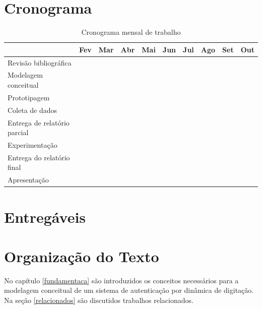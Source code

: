 \documentclass[pfc]{imetex}
\begin{document}
\section{Cronograma}
\begin{table}[htb]
\begin{tabular}{|l|c|c|c|c|c|c|c|c|c|}
\hline
& Fev & Mar & Abr & Mai & Jun & Jul & Ago & Set & Out \\
\hline
Revisão bibliográfica &
\multicolumn{2}{c}{\cellcolor[gray]{0.5}} &
\multicolumn{6}{c}{} &
\\
\hline
Modelagem conceitual &
\multicolumn{1}{c}{} &
\multicolumn{3}{c}{\cellcolor[gray]{0.5}} &
\multicolumn{4}{c}{} &
\\
\hline
Prototipagem &
\multicolumn{2}{c}{} &
\multicolumn{3}{c}{\cellcolor[gray]{0.5}} &
\multicolumn{3}{c}{} &
\\
\hline
Coleta de dados &
\multicolumn{4}{c}{} &
\multicolumn{1}{c}{\cellcolor[gray]{0.5}} &
\multicolumn{3}{c}{} &
\\
\hline
Entrega de relatório parcial &
\multicolumn{3}{c}{} &
\multicolumn{1}{c}{\cellcolor[gray]{0.5}} &
\multicolumn{1}{c}{} &
\multicolumn{1}{c}{\cellcolor[gray]{0.5}} &
\multicolumn{2}{c}{} &
\\
\hline
Experimentação &
\multicolumn{5}{c}{} &
\multicolumn{2}{c}{\cellcolor[gray]{0.5}} &
\multicolumn{1}{c}{} &
\\
\hline
Entrega do relatório final &
\multicolumn{7}{c}{} &
\multicolumn{1}{c}{\cellcolor[gray]{0.5}} &
\\
\hline
Apresentação &
\multicolumn{8}{c}{} &
\multicolumn{1}{c}{\cellcolor[gray]{0.5}}
\\
\hline
\end{tabular}

\caption{Cronograma mensal de trabalho}
\end{table}

\section{Entregáveis}

\section{Organização do Texto}
No capítulo \ref{fundamentaca} são introduzidos os conceitos necessários para a modelagem conceitual de um sistema de autenticação por dinâmica de digitação. Na seção \ref{relacionados} são discutidos trabalhos relacionados.
\end{document}
